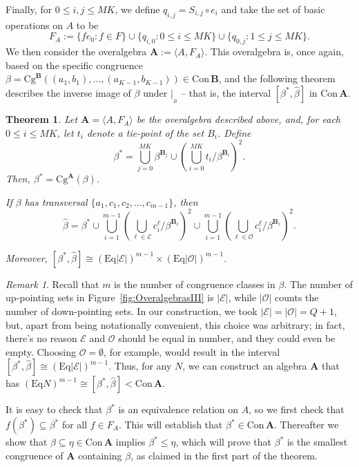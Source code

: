 \documentclass[cm,dissertation]{uhthesis}
\theoremstyle{plain}
\newtheorem{theorem}{Theorem}[section]
\theoremstyle{definition}
\newcounter{claim}
\theoremstyle{remark}
\newtheorem*{remark}{Remark}
\numberwithin{theorem}{section}
\numberwithin{claim}{chapter}
\numberwithin{equation}{section}
\numberwithin{conjecture}{chapter}
\newcommand{\<}{\ensuremath{\langle}}
\renewcommand{\>}{\ensuremath{\rangle}}
\renewcommand{\leq}{\ensuremath{\leqslant}}
\newcommand{\Eq}{\ensuremath{\mathrm{Eq}}}
\newcommand{\Cg}{\ensuremath{\mathrm{Cg}}}
\newcommand{\Con}{\ensuremath{\mathrm{Con\,}}}
\newcommand{\0}{\ensuremath{\mathbf{0}}}
\newcommand{\1}{\ensuremath{\mathbf{1}}}
\newcommand{\2}{\ensuremath{\mathbf{2}}}
\newcommand{\3}{\ensuremath{\mathbf{3}}}
\newcommand{\4}{\ensuremath{\mathbf{4}}}
\newcommand{\5}{\ensuremath{\mathbf{5}}}
\newcommand{\bA}{\ensuremath{\mathbf{A}}}
\newcommand{\bB}{\ensuremath{\mathbf{B}}}
\newcommand{\sE}{\ensuremath{\mathscr{E}}}
\newcommand{\sO}{\ensuremath{\mathscr{O}}}
\newcommand{\resB}{\ensuremath{|_{_B}}}
\newcommand{\hbeta}{\ensuremath{\widehat{\beta}}}
\begin{document}
Finally, for $0\leq i, j\leq MK$, we define
$q_{i,j}=S_{i,j}\circ e_i$ and take the set of basic operations on $A$ to be
\[
F_A := \{f e_0 : f\in F\}  \cup \{q_{i,0} : 0\leq i \leq MK\}\cup \{q_{0,j} : 1\leq j \leq MK\}.
\]
We then consider the overalgebra $\bA := \< A, F_A\>$.   This overalgebra is,
once again, based on the specific congruence
$\beta = \Cg^{\bB}((a_1, b_1), \dots, (a_{K-1},b_{K-1})) \in \Con \bB$, and the following
theorem describes the inverse image of $\beta$ under $\resB$ -- that is, 
the interval $[\beta^*,\hbeta]$ in $\Con \bA$.
\begin{theorem}
  \label{thm-overalgebras-iii}
  Let $\bA = \< A, F_A\>$ be the overalgebra described above,
  and, for each $0\leq i \leq MK$, let $t_i$ denote a tie-point of the set 
  $B_i$.  Define
  \[ \beta^* = \bigcup_{j=0}^{MK} \beta^{\bB_j} \cup 
  \left(\bigcup_{i=0}^{MK}t_i/\beta^{\bB_i}\right)^2.
  \]
  Then, $\beta^* = \Cg^{\bA}(\beta)$.

  If $\beta$ has transversal $\{a_1, c_1, c_2, \dots, c_{m-1}\}$, then
  \begin{equation}
    \label{eq:OA5}
    \widehat{\beta} = \beta^* 
    \cup 
    \bigcup_{i=1}^{m-1}\left(\bigcup_{\ell \in \sE} c_i^\ell/\beta^{\bB_{\ell}}\right)^2
    \cup 
    \bigcup_{i=1}^{m-1}\left(\bigcup_{\ell \in \sO}
    c_i^\ell/\beta^{\bB_{\ell}}\right)^2.
  \end{equation}

  Moreover, $[\beta^*, \widehat{\beta}] \cong (\Eq|\sE|)^{m-1} \times (\Eq|\sO|)^{m-1}$. 
\end{theorem}
\begin{remark}
  Recall that $m$ is the number of congruence classes in $\beta$.
  The number of up-pointing sets in Figure~\ref{fig:OveralgebrasIII}
  is $|\sE|$, while $|\sO|$ counts the number of
  down-pointing sets.  In our construction, we took 
  $|\sE| = |\sO| = Q+1$, but, apart from being notationally convenient, this
  choice was arbitrary; in fact, there's no reason $\sE$ and $\sO$ should be equal
  in number, and they could even be empty.  Choosing $\sO = \emptyset$, for
  example, would result in the interval 
  $[\beta^*, \widehat{\beta}] \cong (\Eq|\sE|)^{m-1}$.  Thus, for any $N$, we can
  construct an algebra $\bA$ that has
  $(\Eq N)^{m-1} \cong [\beta^*, \widehat{\beta}] < \Con \bA$.  

\end{remark}

It is easy to check that $\beta^*$ is an equivalence relation on $A$, so we first
check that $f(\beta^*)\subseteq 
\beta^*$ for all $f\in F_A$.  This will establish that $\beta^*\in \Con\bA$.
Thereafter we show that $\beta \subseteq \eta \in \Con\bA$ implies 
$\beta^*\leq \eta$, which will prove that $\beta^*$ is the smallest congruence
of $\bA$ containing $\beta$, as claimed in the first part of the theorem.
\end{document}
